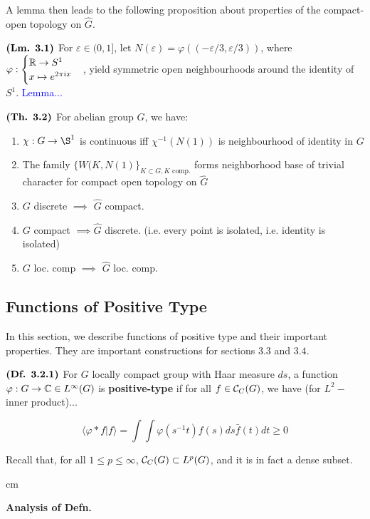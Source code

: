 \documentclass{article}
\begin{document}
A lemma then leads to the following proposition about properties of the compact-open topology on $\hat{G}$.

$\textbf{(Lm. 3.1)}$ For $\varepsilon \in (0,1]$, let $N(\varepsilon) = \varphi((-\varepsilon/3,\varepsilon/3))$, where $\varphi: \begin{cases}
    \mathbb{R} \rightarrow S^1 \\
    x \mapsto e^{2\pi ix}
\end{cases} $, yield symmetric open neighbourhoods around the identity of $S^1$. \textcolor{blue}{Lemma...}

$\textbf{(Th. 3.2)}$
For abelian group $G$, we have:
\begin{enumerate}
    \item $\chi:G \ra \S^1$ is continuous iff $\chi^{-1}(N(1))$ is neighbourhood of identity in $G$
    \item The family $\{W(K,N(1)\}_{K \subset G, K \text{ comp.}} $ forms neighborhood base of trivial character for compact open topology on $\hat{G}$
    \item $G$ discrete $\implies$ $\hat{G}$ compact.
    \item $G$ compact $\implies \hat{G}$ discrete. (i.e. every point is isolated, i.e. identity is isolated)
    \item $G$ loc. comp $\implies$ $\hat{G}$ loc. comp.
\end{enumerate}

\subsection{Functions of Positive Type}
In this section, we describe functions of positive type and their important properties. They are important constructions for sections $3.3$ and $3.4$.

$\textbf{(Df. 3.2.1)}$ For $G$ locally compact group with Haar measure $ds$, a function $\varphi:G \rightarrow \mathbb{C} \in L^{\infty}(G)$ is \textbf{positive-type} if for all $f \in \mathcal{C}_C(G)$, we have (for $L^2-$inner product)...

$$\langle\varphi * f|f\rangle = \int \int \varphi(s^{-1}t)f(s)ds \bar{f}(t) dt \geq 0$$

Recall that, for all $ 1 \leq p \leq \infty$, $\mathcal{C}_C(G) \subset L^p(G)$, and it is in fact a dense subset.

 cm

\textbf{Analysis of Defn.}

\end{document}
